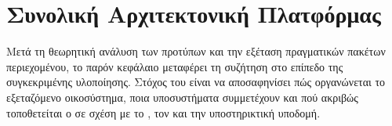 \chapter{Συνολική Αρχιτεκτονική Πλατφόρμας }
\label{ch:platform_architecture}

Μετά τη θεωρητική ανάλυση των προτύπων και την εξέταση πραγματικών πακέτων περιεχομένου, το παρόν κεφάλαιο μεταφέρει
τη συζήτηση στο επίπεδο της συγκεκριμένης υλοποίησης. Στόχος του είναι να αποσαφηνίσει πώς οργανώνεται το εξεταζόμενο οικοσύστημα,
ποια υποσυστήματα συμμετέχουν και πού ακριβώς τοποθετείται ο  σε σχέση με το , τον 
και την υποστηρικτική υποδομή.



